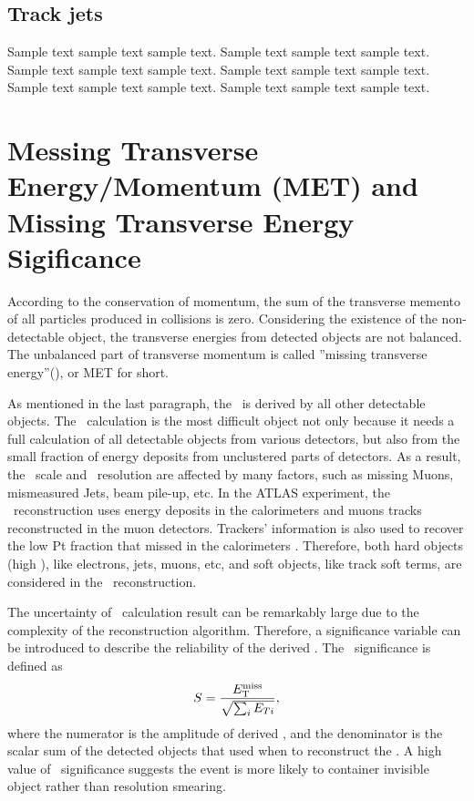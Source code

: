 \subsection{Track jets}
\label{sec:track}
Sample text sample text sample text. Sample text sample text sample text.
Sample text sample text sample text. Sample text sample text sample text.
Sample text sample text sample text. Sample text sample text sample text.


\section{Messing Transverse Energy/Momentum (MET) and Missing Transverse Energy Sigificance}

\label{sec:met}
\par According to the conservation of momentum, the sum of the transverse memento of all particles produced in collisions is zero. Considering the existence of the non-detectable object, the transverse energies from detected objects are not balanced. The unbalanced part of transverse momentum is called ''missing transverse energy''(\met), or MET for short.

\par As mentioned in the last paragraph, the \met~is derived by all other detectable objects. The \met~calculation is the most difficult object not only because it needs a full calculation of all detectable objects from various detectors, but also from the small fraction of energy deposits from unclustered parts of detectors. As a result, the \met~scale and \met~resolution are affected by many factors, such as missing Muons, mismeasured Jets, beam pile-up, etc. In the ATLAS experiment, the \met~reconstruction uses energy deposits in the calorimeters and muons tracks reconstructed in the muon detectors. Trackers' information is also used to recover the low Pt fraction that missed in the calorimeters \cite{ATLAS-CONF-2013-082}. Therefore, both hard objects (high \pt), like electrons, jets, muons, etc, and soft objects, like track soft terms, are considered in the \met~reconstruction.

\par The uncertainty of \met~calculation result can be remarkably large due to the complexity of the reconstruction algorithm. Therefore, a significance variable can be introduced to describe the reliability of the derived \met. The \met~significance is defined as
$$ S=\frac{E_{\mathrm{T}}^{\mathrm{miss}}}{\sqrt{\sum_{i}E_{Ti}}}, $$
where the numerator is the amplitude of derived \met, and the denominator is the scalar sum of the detected objects that used when to reconstruct the \met. A high value of \met~significance suggests the event is more likely to container invisible object rather than resolution smearing.
